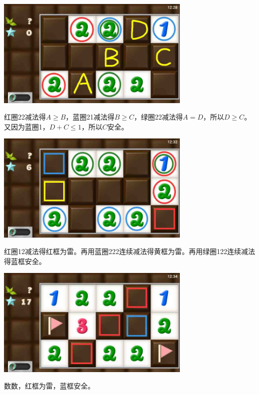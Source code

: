 \subsection{} %
\begin{center}
    \includegraphics[width=0.7\textwidth]{puzzlelow/84-1.jpg}
\end{center}
红圈22减法得$A\ge B$，蓝圈21减法得$B\ge C$，绿圈22减法得$A=D$，所以$D\ge C$。又因为蓝圈1，$D+C\le 1$，所以$C$安全。
\begin{center}
    \includegraphics[width=0.7\textwidth]{puzzlelow/84-2.jpg}
\end{center}
红圈12减法得红框为雷。再用蓝圈222连续减法得黄框为雷。再用绿圈122连续减法得蓝框安全。
\begin{center}
    \includegraphics[width=0.7\textwidth]{puzzlelow/84-3.jpg}
\end{center}
数数，红框为雷，蓝框安全。

